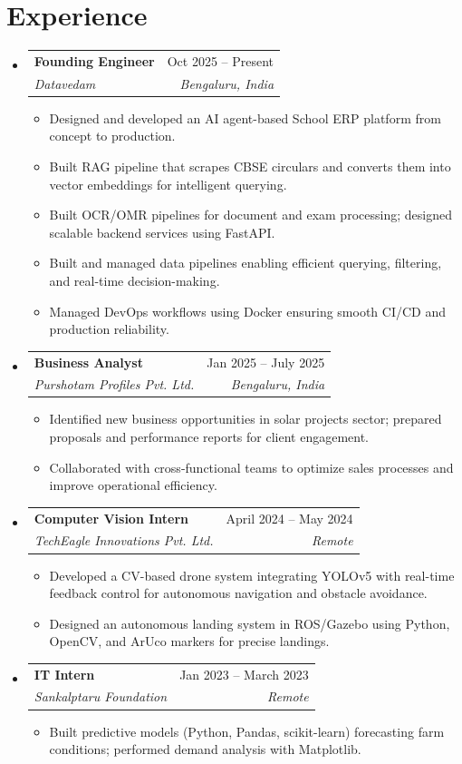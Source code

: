 \documentclass[letterpaper,10pt]{article}
\makeatletter
\newcommand{\resumeItem}[1]{
  \item\small{
    {#1 \vspace{-1pt}}
  }
}
\newcommand{\resumeSubheading}[4]{
  \vspace{-1pt}\item
    \begin{tabular*}{0.97\textwidth}[t]{l@{\extracolsep{\fill}}r}
      \textbf{#1} & #2 \\
      \textit{\small #3} & \textit{\small #4} \\
    \end{tabular*}\vspace{-5pt}
}
\newcommand{\resumeSubHeadingListStart}{\begin{itemize}[leftmargin=0.15in, label={}]}
\newcommand{\resumeSubHeadingListEnd}{\end{itemize}\vspace{-5pt}}
\newcommand{\resumeItemListStart}{\begin{itemize}\vspace{-3pt}}
\newcommand{\resumeItemListEnd}{\end{itemize}\vspace{-2pt}}
\makeatother
\begin{document}
\section{Experience}
\resumeSubHeadingListStart
    \resumeSubheading
      {Founding Engineer}{Oct 2025 -- Present}
      {Datavedam}{Bengaluru, India}
      \resumeItemListStart
        \resumeItem{Designed and developed an AI agent-based School ERP platform from concept to production.}
        \resumeItem{Built RAG pipeline that scrapes CBSE circulars and converts them into vector embeddings for intelligent querying.}
        \resumeItem{Built OCR/OMR pipelines for document and exam processing; designed scalable backend services using FastAPI.}
        \resumeItem{Built and managed data pipelines enabling efficient querying, filtering, and real-time decision-making.}
        \resumeItem{Managed DevOps workflows using Docker ensuring smooth CI/CD and production reliability.}
      \resumeItemListEnd
    \resumeSubheading
      {Business Analyst}{Jan 2025 -- July 2025}
      {Purshotam Profiles Pvt. Ltd.}{Bengaluru, India}
      \resumeItemListStart
        \resumeItem{Identified new business opportunities in solar projects sector; prepared proposals and performance reports for client engagement.}
        \resumeItem{Collaborated with cross-functional teams to optimize sales processes and improve operational efficiency.}
      \resumeItemListEnd
    \resumeSubheading
      {Computer Vision Intern}{April 2024 -- May 2024}
      {TechEagle Innovations Pvt. Ltd.}{Remote}
      \resumeItemListStart
        \resumeItem{Developed a CV-based drone system integrating YOLOv5 with real-time feedback control for autonomous navigation and obstacle avoidance.}
        \resumeItem{Designed an autonomous landing system in ROS/Gazebo using Python, OpenCV, and ArUco markers for precise landings.}
      \resumeItemListEnd
    \resumeSubheading
      {IT Intern}{Jan 2023 -- March 2023}
      {Sankalptaru Foundation}{Remote}
      \resumeItemListStart
        \resumeItem{Built predictive models (Python, Pandas, scikit-learn) forecasting farm conditions; performed demand analysis with Matplotlib.}
      \resumeItemListEnd
\resumeSubHeadingListEnd
\end{document}
